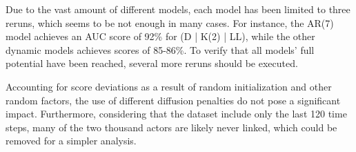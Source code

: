     Due to the vast amount of different models, each model has been limited to three reruns, which seems to be not enough in many cases. For instance, the AR(7) model achieves an AUC score of 92\% for (D | K(2) | LL), while the other dynamic models achieves scores of 85-86\%. To verify that all models' full potential have been reached, several more reruns should be executed.
    
    Accounting for score deviations as a result of random initialization and other random factors, the use of different diffusion penalties do not pose a significant impact. Furthermore, considering that the dataset include only the last 120 time steps, many of the two thousand actors are likely never linked, which could be removed for a simpler analysis.
